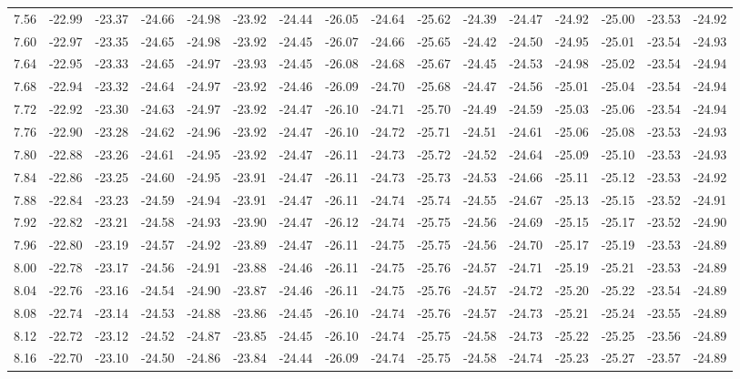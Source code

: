 \documentclass[floatfix,traditabstract,preprint2]{aa}
\begin{document}
\begin{table}
\begin{tabular}{c  c c c c c c c c c c c c c c c}
7.56 & -22.99 & -23.37 & -24.66 & -24.98 & -23.92 & -24.44 & -26.05 & -24.64 & -25.62 & -24.39 & -24.47 & -24.92 & -25.00 & -23.53 & -24.92\\
7.60 & -22.97 & -23.35 & -24.65 & -24.98 & -23.92 & -24.45 & -26.07 & -24.66 & -25.65 & -24.42 & -24.50 & -24.95 & -25.01 & -23.54 & -24.93\\
7.64 & -22.95 & -23.33 & -24.65 & -24.97 & -23.93 & -24.45 & -26.08 & -24.68 & -25.67 & -24.45 & -24.53 & -24.98 & -25.02 & -23.54 & -24.94\\
7.68 & -22.94 & -23.32 & -24.64 & -24.97 & -23.92 & -24.46 & -26.09 & -24.70 & -25.68 & -24.47 & -24.56 & -25.01 & -25.04 & -23.54 & -24.94\\
7.72 & -22.92 & -23.30 & -24.63 & -24.97 & -23.92 & -24.47 & -26.10 & -24.71 & -25.70 & -24.49 & -24.59 & -25.03 & -25.06 & -23.54 & -24.94\\
7.76 & -22.90 & -23.28 & -24.62 & -24.96 & -23.92 & -24.47 & -26.10 & -24.72 & -25.71 & -24.51 & -24.61 & -25.06 & -25.08 & -23.53 & -24.93\\
7.80 & -22.88 & -23.26 & -24.61 & -24.95 & -23.92 & -24.47 & -26.11 & -24.73 & -25.72 & -24.52 & -24.64 & -25.09 & -25.10 & -23.53 & -24.93\\
7.84 & -22.86 & -23.25 & -24.60 & -24.95 & -23.91 & -24.47 & -26.11 & -24.73 & -25.73 & -24.53 & -24.66 & -25.11 & -25.12 & -23.53 & -24.92\\
7.88 & -22.84 & -23.23 & -24.59 & -24.94 & -23.91 & -24.47 & -26.11 & -24.74 & -25.74 & -24.55 & -24.67 & -25.13 & -25.15 & -23.52 & -24.91\\
7.92 & -22.82 & -23.21 & -24.58 & -24.93 & -23.90 & -24.47 & -26.12 & -24.74 & -25.75 & -24.56 & -24.69 & -25.15 & -25.17 & -23.52 & -24.90\\
7.96 & -22.80 & -23.19 & -24.57 & -24.92 & -23.89 & -24.47 & -26.11 & -24.75 & -25.75 & -24.56 & -24.70 & -25.17 & -25.19 & -23.53 & -24.89\\
8.00 & -22.78 & -23.17 & -24.56 & -24.91 & -23.88 & -24.46 & -26.11 & -24.75 & -25.76 & -24.57 & -24.71 & -25.19 & -25.21 & -23.53 & -24.89\\
8.04 & -22.76 & -23.16 & -24.54 & -24.90 & -23.87 & -24.46 & -26.11 & -24.75 & -25.76 & -24.57 & -24.72 & -25.20 & -25.22 & -23.54 & -24.89\\
8.08 & -22.74 & -23.14 & -24.53 & -24.88 & -23.86 & -24.45 & -26.10 & -24.74 & -25.76 & -24.57 & -24.73 & -25.21 & -25.24 & -23.55 & -24.89\\
8.12 & -22.72 & -23.12 & -24.52 & -24.87 & -23.85 & -24.45 & -26.10 & -24.74 & -25.75 & -24.58 & -24.73 & -25.22 & -25.25 & -23.56 & -24.89\\
8.16 & -22.70 & -23.10 & -24.50 & -24.86 & -23.84 & -24.44 & -26.09 & -24.74 & -25.75 & -24.58 & -24.74 & -25.23 & -25.27 & -23.57 & -24.89\\
\hline                                   
\end{tabular}
\end{table}  
\end{document}
